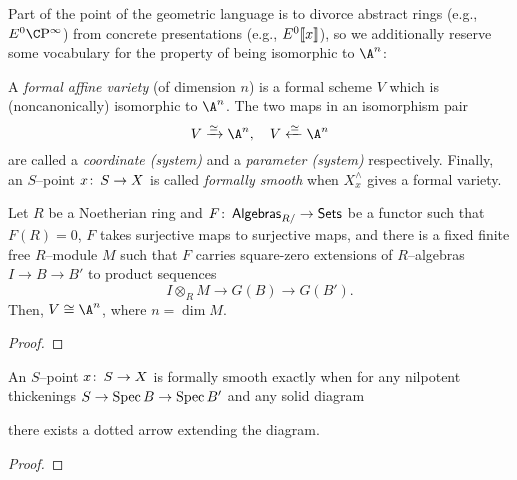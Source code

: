 Part of the point of the geometric language is to divorce abstract rings (e.g., $E^0 \CP^\infty$) from concrete presentations (e.g., $E^0\llbracket{x}\rrbracket$), so we additionally reserve some vocabulary for the property of being isomorphic to $\A^n$:
\begin{definition}\label{DefnFormalVariety}
A \textit{formal affine variety} (of dimension $n$) is a formal scheme $V$ which is (noncanonically) isomorphic to $\A^n$.  The two maps in an isomorphism pair \[V \xrightarrow{\simeq} \A^n, \quad V \xleftarrow{\simeq} \A^n\] are called a \textit{coordinate (system)} and a \textit{parameter (system)} respectively.  Finally, an $S$--point $x\colon\thinspace S \to X$ is called \textit{formally smooth} when $X^\wedge_x$ gives a formal variety.
\end{definition}

\begin{theorem}\label{DetectingFormalVarieties}
Let $R$ be a Noetherian ring and $F\colon\thinspace \mathsf{Algebras}_{R/} \to \mathsf{Sets}$ be a functor such that $F(R) = 0$, $F$ takes surjective maps to surjective maps, and there is a fixed finite free $R$--module $M$ such that $F$ carries square-zero extensions of $R$--algebras $I \to B \to B'$ to product sequences \[I \otimes_R M \to G(B) \to G(B').\]  Then, $V \cong \A^n$, where $n = \dim M$.
\end{theorem}
\begin{proof}
\end{proof}

\begin{corollary}
An $S$--point $x\colon\thinspace S \to X$ is formally smooth exactly when for any nilpotent thickenings $S \to \operatorname{Spec} B \to \operatorname{Spec} B'$ and any solid diagram
\begin{center}
\end{center}
there exists a dotted arrow extending the diagram.
\end{corollary}
\begin{proof}
\end{proof}


